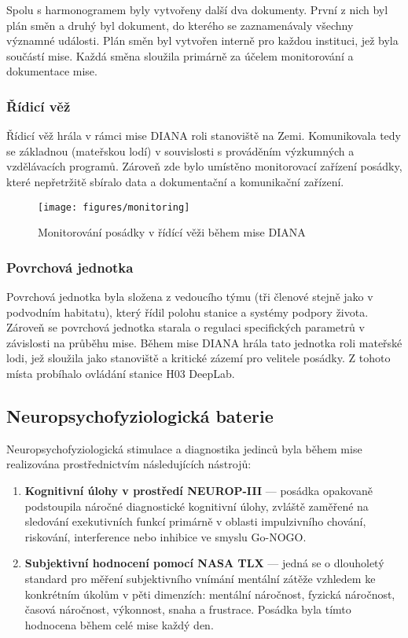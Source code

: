 Spolu s harmonogramem byly vytvořeny další dva dokumenty. První z nich byl plán
směn a druhý byl dokument, do kterého se zaznamenávaly všechny významné
události. Plán směn byl vytvořen interně pro každou instituci, jež byla součástí
mise. Každá směna sloužila primárně za účelem monitorování a dokumentace mise.

\subsubsection{Řídicí věž}
\label{subsubsec:ridici_vez}
Řídicí věž hrála v rámci mise DIANA roli stanoviště na Zemi. Komunikovala tedy
se základnou (mateřskou lodí) v souvislosti s prováděním výzkumných a
vzdělávacích programů. Zároveň zde bylo umístěno monitorovací zařízení posádky,
které nepřetržitě sbíralo data a dokumentační a komunikační zařízení.

\begin{figure}[h]
    \begin{center}
        \texttt{[image: figures/monitoring]}
        \caption{Monitorování posádky v řídící věži během mise DIANA}
        \label{fig:monitoring}
    \end{center}
\end{figure}

\subsubsection{Povrchová jednotka}
\label{subsubsec:povrchova_jednotka}
Povrchová jednotka byla složena z vedoucího týmu (tři členové stejně jako v
podvodním habitatu), který řídil polohu stanice a systémy podpory života.
Zároveň se povrchová jednotka starala o regulaci specifických parametrů v
závislosti na průběhu mise. Během mise DIANA hrála tato jednotka roli mateřské
lodi, jež sloužila jako stanoviště a kritické zázemí pro velitele posádky. Z
tohoto místa probíhalo ovládání stanice H03 DeepLab.

\subsection{Neuropsychofyziologická baterie}
\label{subsubsec:neuro_testy}
Neuropsychofyziologická stimulace a diagnostika jedinců byla během mise
realizována prostřednictvím následujících nástrojů:
\begin{enumerate}
    \item \textbf{Kognitivní úlohy v prostředí NEUROP-III} --- posádka opakovaně
          podstoupila náročné diagnostické kognitivní úlohy, zvláště zaměřené na
          sledování exekutivních funkcí primárně v oblasti impulzivního chování,
          riskování, interference nebo inhibice ve smyslu Go-NOGO.
    \item \textbf{Subjektivní hodnocení pomocí NASA TLX} --- jedná se o
          dlouholetý standard pro měření subjektivního vnímání mentální zátěže
          vzhledem ke konkrétním úkolům v pěti dimenzích: mentální náročnost, fyzická
          náročnost, časová náročnost, výkonnost, snaha a frustrace. Posádka byla
          tímto hodnocena během celé mise každý den.
\end{enumerate}

